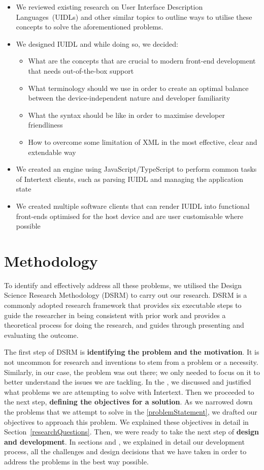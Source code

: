 \begin{itemize}
  \item We reviewed existing research on User Interface Description Languages~(UIDLs) and other similar topics to outline ways to utilise these concepts to solve the aforementioned problems.
  \item We designed IUIDL and while doing so, we decided:
  \begin{itemize}
    \item What are the concepts that are crucial to modern front-end development that needs out-of-the-box support
    \item What terminology should we use in order to create an optimal balance between the device-independent nature and developer familiarity
    \item What the syntax should be like in order to maximise developer friendliness
    \item How to overcome some limitation of XML in the most effective, clear and extendable way
  \end{itemize}
  \item We created an engine using JavaScript/TypeScript to perform common tasks of Intertext clients, such as parsing IUIDL and managing the application state
  \item We created multiple software clients that can render IUIDL into functional front-ends optimised for the host device and are user customisable where possible
\end{itemize}


\section{Methodology} \label{methodology}

To identify and effectively address all these problems, we utilised the Design Science Research Methodology (DSRM) \cite{DSRM} to carry out our research. DSRM is a commonly adopted research framework that provides six executable steps to guide the researcher in being consistent with prior work and provides a theoretical process for doing the research, and guides through presenting and evaluating the outcome. 

The first step of DSRM is \textbf{identifying the problem and the motivation}. It is not uncommon for research and inventions to stem from a problem or a necessity. Similarly, in our case, the problem was out there; we only needed to focus on it to better understand the issues we are tackling. In the , we discussed and justified what problems we are attempting to solve with Intertext. Then we proceeded to the next step, \textbf{defining the objectives for a solution}. As we narrowed down the problems that we attempt to solve in the \ref{problemStatement}, we drafted our objectives to approach this problem. We explained these objectives in detail in Section~\ref{researchQuestions}. Then, we were ready to take the next step of \textbf{design and development}. In sections  and , we explained in detail our development process, all the challenges and design decisions that we have taken in order to address the problems in the best way possible. 


